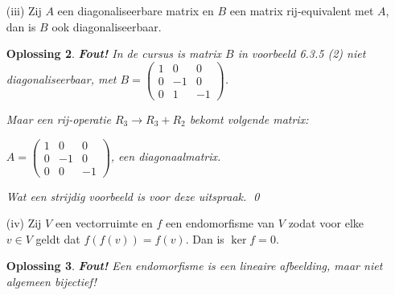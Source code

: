 \documentclass[a4paper,12pt]{article}
\newtheorem{oplossing}{Oplossing}
\begin{document}
\begin{enumerate}
\begin{itemize}
\begin{oplossing}
        Vb:
        \(A = \begin{pmatrix}
            1 & 0 \\
            0 & 5
        \end{pmatrix}
        \)
        en 
        \(B = \begin{pmatrix}
            2 & 0 \\
            0 & 3
        \end{pmatrix}
        \)
        Overduidelijk is:
        \(\lambda_{A,1} = 1, \lambda_{A,2} = 5 \) en \(\lambda_{B,1} = 2, \lambda_{B,2} = 3\).

        Nu is 
        \(AB = \begin{pmatrix}
            2 & 0 \\
            0 & 15
        \end{pmatrix}
        \) 
        met 
        \(\lambda_{AB,1} = 2, \lambda_{AB,2} = 15\). 

        Het is duidelijk dat \(\lambda_{A,1}\lambda_{B,2} = 5 \notin \lambda_{AB}\).\qed
    \end{oplossing}
    \item[(iii)] Zij $A$ een diagonaliseerbare matrix en $B$ een matrix rij-equivalent met $A$, dan is $B$ ook diagonaliseerbaar.
    \begin{oplossing}
        \textbf{Fout!}
        In de cursus is matrix \(B\) in voorbeeld 6.3.5 (2) niet diagonaliseerbaar, met
        \(B = \begin{pmatrix}
            1 & 0 & 0 \\
            0 & -1 & 0\\
            0 & 1 & -1
        \end{pmatrix}\).

        Maar een rij-operatie \(R_3 \to R_3 + R_2\) bekomt volgende matrix:

        \(A = \begin{pmatrix}
            1 & 0 & 0 \\
            0 & -1 & 0\\
            0 & 0 & -1
        \end{pmatrix}\),
        een diagonaalmatrix.

        Wat een strijdig voorbeeld is voor deze uitspraak. \qed
    \end{oplossing}
    \item[(iv)] Zij $V$ een vectorruimte en $f$ een endomorfisme van $V$ zodat voor elke $v \in V$ geldt dat $f(f(v)) = f(v)$. Dan is $\ker f = 0$.
    \begin{oplossing}
        \textbf{Fout!} Een endomorfisme is een lineaire afbeelding, maar niet algemeen bijectief!


\end{oplossing}
\end{itemize}
\end{enumerate}
\end{document}
